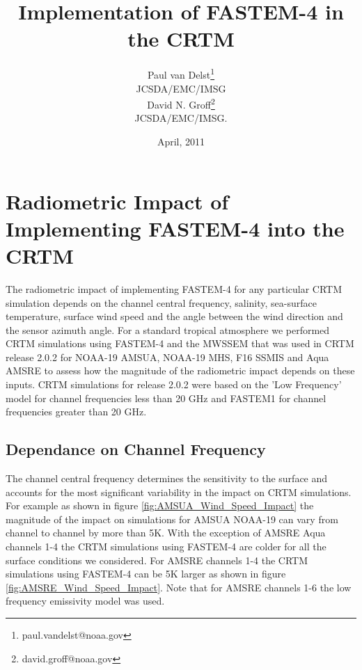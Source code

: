 

%

\title{Implementation of FASTEM-4 in the CRTM}
\author{Paul van Delst\footnote{paul.vandelst@noaa.gov}\\JCSDA/EMC/IMSG\\[0.25in]
        David N. Groff\footnote{david.groff@noaa.gov}\\JCSDA/EMC/IMSG.}
\date{April, 2011}


\maketitle


\section{Radiometric Impact of Implementing FASTEM-4 into the CRTM}
The radiometric impact of implementing FASTEM-4 for any particular CRTM simulation depends on the channel central frequency, salinity, sea-surface temperature, surface wind speed and the angle between the wind direction and the sensor azimuth angle.  For a standard tropical atmosphere we performed CRTM simulations using FASTEM-4 and the MWSSEM that was used in CRTM release 2.0.2 for NOAA-19 AMSUA, NOAA-19 MHS, F16 SSMIS and Aqua AMSRE to assess how the magnitude of the radiometric impact depends on these inputs.  CRTM simulations for release 2.0.2 were based on the 'Low Frequency' model for channel frequencies less than 20 GHz and FASTEM1 for channel frequencies greater than 20 GHz. 

\subsection{Dependance on Channel Frequency}
The channel central frequency determines the sensitivity to the surface and accounts for the most significant variability in the impact on CRTM simulations.  For example as shown in figure \ref{fig:AMSUA_Wind_Speed_Impact} the magnitude of the impact on simulations for AMSUA NOAA-19 can vary from channel to channel by more than 5K.  With the exception of AMSRE Aqua channels 1-4 the CRTM simulations using FASTEM-4 are colder for all the surface conditions we considered.  For AMSRE channels 1-4 the CRTM simulations using FASTEM-4 can be 5K larger as shown in figure \ref{fig:AMSRE_Wind_Speed_Impact}.  Note that for AMSRE channels 1-6 the low frequency emissivity model was used.

